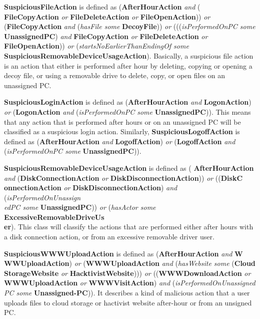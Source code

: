 \textbf{SuspiciousFileAction} is defined as (\textbf{AfterHourAction} \textit{and} ( \textbf{FileCopyAction} \textit{or} \textbf{FileDeleteAction} \textit{or} \textbf{FileOpenAction})) \textit{or} (\textbf{FileCopyAction} \textit{and} (\textit{hasFile some} \textbf{DecoyFile})) \textit{or} (((\textit{isPerformedOnPC some} \textbf{UnassignedPC}) \textit{and} \textbf{FileCopyAction} \textit{or} \textbf{FileDeleteAction} \textit{or}  \textbf{FileOpenAction})) \textit{or} (\textit{startsNoEarlierThanEndingOf some} \textbf{SuspiciousRemovableDeviceUsageAction}). 
Basically, a suspicious file action is an action that either is performed after hour by deleting, copying or opening a decoy file, or using a removable drive to delete, copy, or open files on an unassigned PC. 

\textbf{SuspiciousLoginAction} is defined as (\textbf{AfterHourAction} \textit{and} \textbf{LogonAction}) \textit{or} (\textbf{LogonAction} \textit{and} (\textit{isPerformedOnPC some} \textbf{UnassignedPC})).
This means that any action that is performed after hours or on an unassigned PC will be classified as a suspicious login action. 
Similarly, \textbf{SuspiciousLogoffAction} is defined as (\textbf{AfterHourAction} \textit{and} \textbf{LogoffAction}) \textit{or} (\textbf{LogoffAction} \textit{and} (\textit{isPerformedOnPC some} \textbf{UnassignedPC})).

\textbf{SuspiciousRemovableDeviceUsageAction} is defined as ( \textbf{AfterHourAction} \textit{and} (\textbf{DiskConnectionAction} \textit{or} \textbf{DiskDisconnectionAction})) \textit{or} ((\textbf{DiskC\\onnectionAction} \textit{or} \textbf{DiskDisconnectionAction}) \textit{and} (\textit{isPerformedOnUnassign\\edPC some} \textbf{UnassignedPC})) \textit{or} (\textit{hasActor some} \textbf{ExcessiveRemovableDriveUs\\er}).
This class will classify the actions that are performed either after hours with a disk connection action, or from an excessive removable driver user. 

\textbf{SuspiciousWWWUploadAction} is defined as (\textbf{AfterHourAction} \textit{and} \textbf{W\\WWUploadAction}) \textit{or} (\textbf{WWWUploadAction} \textit{and} (\textit{hasWebsite some} (\textbf{Cloud\\StorageWebsite} \textit{or} \textbf{HacktivistWebsite}))) \textit{or} ((\textbf{WWWDownloadAction} \textit{or} \textbf{WWWUploadAction} \textit{or} \textbf{WWWVisitAction}) \textit{and} (\textit{isPerformedOnUnassigned\\PC some} \textbf{Unassigned-PC})).
It describes a kind of malicious action that a user uploads files to cloud storage or hactivist website after-hour or from an unsigned PC.

